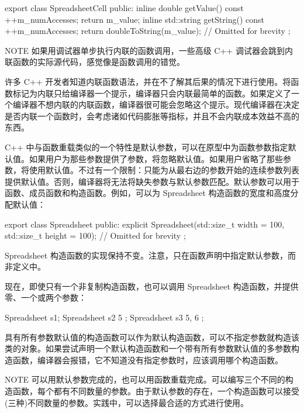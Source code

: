 \begin{cpp}
export class SpreadsheetCell
{
    public:
        inline double getValue() const { ++m_numAccesses; return m_value; }
        inline std::string getString() const
        {
            ++m_numAccesses;
            return doubleToString(m_value);
        }
        // Omitted for brevity
};
\end{cpp}

\begin{myNotic}{NOTE}
如果用调试器单步执行内联的函数调用，一些高级 C++ 调试器会跳到内联函数的实际源代码，感觉像是函数调用的错觉。
\end{myNotic}

许多 C++ 开发者知道内联函数语法，并在不了解其后果的情况下进行使用。将函数标记为内联只给编译器一个提示，编译器只会内联最简单的函数。如果定义了一个编译器不想内联的内联函数，编译器很可能会忽略这个提示。现代编译器在决定是否内联一个函数时，会考虑诸如代码膨胀等指标，并且不会内联成本效益不高的东西。


C++ 中与函数重载类似的一个特性是默认参数，可以在原型中为函数参数指定默认值。如果用户为那些参数提供了参数，将忽略默认值。如果用户省略了那些参数，将使用默认值。不过有一个限制：只能为从最右边的参数开始的连续参数列表提供默认值。否则，编译器将无法将缺失参数与默认参数匹配。默认参数可以用于函数、成员函数和构造函数。例如，可以为 Spreadsheet 构造函数的宽度和高度分配默认值：

\begin{cpp}
export class Spreadsheet
{
    public:
        explicit Spreadsheet(std::size_t width = 100, std::size_t height = 100);
        // Omitted for brevity
};
\end{cpp}

Spreadsheet 构造函数的实现保持不变。注意，只在函数声明中指定默认参数，而非定义中。

现在，即使只有一个非复制构造函数，也可以调用 Spreadsheet 构造函数，并提供零、一个或两个参数：

\begin{cpp}
Spreadsheet s1;
Spreadsheet s2 { 5 };
Spreadsheet s3 { 5, 6 };
\end{cpp}

具有所有参数默认值的构造函数可以作为默认构造函数，可以不指定参数就构造该类的对象。如果尝试声明一个默认构造函数和一个带有所有参数默认值的多参数构造函数，编译器会报错，它不知道没有指定参数时，应该调用哪个构造函数。

\begin{myNotic}{NOTE}
可以用默认参数完成的，也可以用函数重载完成。可以编写三个不同的构造函数，每个都有不同数量的参数。由于默认参数的存在，一个构造函数可以接受(三种)不同数量的参数。实践中，可以选择最合适的方式进行使用。
\end{myNotic}














